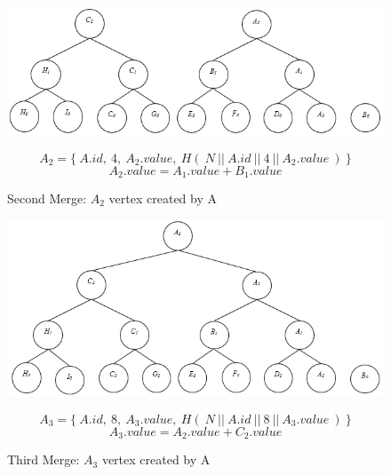 	\begin{figure}[hp]
		\centering
		\includegraphics[scale = 0.7]{images/commitment-tree-example-3.png}\\
		\caption{Second Merge: $A_{2}$ vertex created by A}
		\label{fig:commitment-tree-example-3}
		\begin{equation}
			A_{2} = \{\ A.id,\ 4,\ A_{2}.value,\ H(\ N\ ||\ A.id\ ||\ 4\ ||\ A_{2}.value\ )\ \} 
		\end{equation}
		\begin{equation}
			A_{2}.value = A_{1}.value + B_{1}.value
		\end{equation}
	\end{figure}

	\begin{figure}[hp]
		\centering
		\includegraphics[scale = 0.7]{images/commitment-tree-example-4.png}\\
		\caption{Third Merge: $A_{3}$ vertex created by A}
		\label{fig:commitment-tree-example-4}
		\begin{equation}
			A_{3} = \{\ A.id,\ 8,\ A_{3}.value,\ H(\ N\ ||\ A.id\ ||\ 8\ ||\ A_{3}.value\ )\ \} 
		\end{equation}
		\begin{equation}
			A_{3}.value = A_{2}.value + C_{2}.value
		\end{equation}
	\end{figure}

